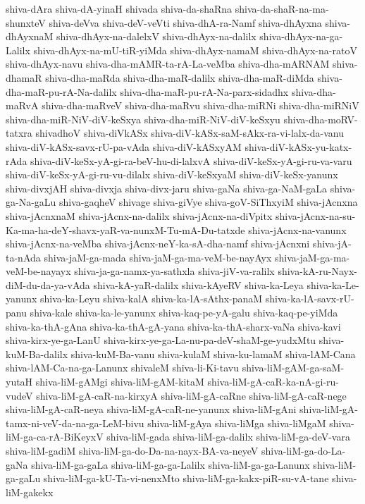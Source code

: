 {shiva-dAra
shiva-dA-yinaH
shivada
shiva-da-shaRna
shiva-da-shaR-na-ma-shunxteV
shiva-deVva
shiva-deV-veVti
shiva-dhA-ra-Namf
shiva-dhAyxna
shiva-dhAyxnaM
shiva-dhAyx-na-dalelxV
shiva-dhAyx-na-dalilx
shiva-dhAyx-na-ga-Lalilx
shiva-dhAyx-na-mU-tiR-yiMda
shiva-dhAyx-namaM
shiva-dhAyx-na-ratoV
shiva-dhAyx-navu
shiva-dha-mAMR-ta-rA-La-veMba
shiva-dha-mARNAM
shiva-dhamaR
shiva-dha-maRda
shiva-dha-maR-dalilx
shiva-dha-maR-diMda
shiva-dha-maR-pu-rA-Na-dalilx
shiva-dha-maR-pu-rA-Na-parx-sidadhx
shiva-dha-maRvA
shiva-dha-maRveV
shiva-dha-maRvu
shiva-dha-miRNi
shiva-dha-miRNiV
shiva-dha-miR-NiV-diV-keSxya
shiva-dha-miR-NiV-diV-keSxyu
shiva-dha-moRV-tatxra
shivadhoV
shiva-diVkASx
shiva-diV-kASx-saM-sAkx-ra-vi-lalx-da-vanu
shiva-diV-kASx-savx-rU-pa-vAda
shiva-diV-kASxyAM
shiva-diV-kASx-yu-katx-rAda
shiva-diV-keSx-yA-gi-ra-beV-hu-di-lalxvA
shiva-diV-keSx-yA-gi-ru-va-varu
shiva-diV-keSx-yA-gi-ru-vu-dilalx
shiva-diV-keSxyaM
shiva-diV-keSx-yanunx
shiva-divxjAH
shiva-divxja
shiva-divx-jaru
shiva-gaNa
shiva-ga-NaM-gaLa
shiva-ga-Na-gaLu
shiva-gaqheV
shivage
shiva-giVye
shiva-goV-SiThxyiM
shiva-jAcnxna
shiva-jAcnxnaM
shiva-jAcnx-na-dalilx
shiva-jAcnx-na-diVpitx
shiva-jAcnx-na-su-Ka-ma-ha-deY-shavx-yaR-va-nunxM-Tu-mA-Du-tatxde
shiva-jAcnx-na-vanunx
shiva-jAcnx-na-veMba
shiva-jAcnx-neY-ka-sA-dha-namf
shiva-jAcnxni
shiva-jA-ta-nAda
shiva-jaM-ga-mada
shiva-jaM-ga-ma-veM-be-nayAyx
shiva-jaM-ga-ma-veM-be-nayayx
shiva-ja-ga-namx-ya-sathxla
shiva-jiV-va-ralilx
shiva-kA-ru-Nayx-diM-du-da-ya-vAda
shiva-kA-yaR-dalilx
shiva-kAyeRV
shiva-ka-Leya
shiva-ka-Le-yanunx
shiva-ka-Leyu
shiva-kalA
shiva-ka-lA-sAthx-panaM
shiva-ka-lA-savx-rU-panu
shiva-kale
shiva-ka-le-yanunx
shiva-kaq-pe-yA-galu
shiva-kaq-pe-yiMda
shiva-ka-thA-gAna
shiva-ka-thA-gA-yana
shiva-ka-thA-sharx-vaNa
shiva-kavi
shiva-kirx-ye-ga-LanU
shiva-kirx-ye-ga-La-nu-pa-deV-shaM-ge-yudxMtu
shiva-kuM-Ba-dalilx
shiva-kuM-Ba-vanu
shiva-kulaM
shiva-ku-lamaM
shiva-lAM-Cana
shiva-lAM-Ca-na-ga-Lanunx
shivaleM
shiva-li-Ki-tavu
shiva-liM-gAM-ga-saM-yutaH
shiva-liM-gAMgi
shiva-liM-gAM-kitaM
shiva-liM-gA-caR-ka-nA-gi-ru-vudeV
shiva-liM-gA-caR-na-kirxyA
shiva-liM-gA-caRne
shiva-liM-gA-caR-nege
shiva-liM-gA-caR-neya
shiva-liM-gA-caR-ne-yanunx
shiva-liM-gAni
shiva-liM-gA-tamx-ni-veV-da-na-ga-LeM-bivu
shiva-liM-gAya
shiva-liMga
shiva-liMgaM
shiva-liM-ga-ca-rA-BiKeyxV
shiva-liM-gada
shiva-liM-ga-dalilx
shiva-liM-ga-deV-vara
shiva-liM-gadiM
shiva-liM-ga-do-Da-na-nayx-BA-va-neyeV
shiva-liM-ga-do-La-gaNa
shiva-liM-ga-gaLa
shiva-liM-ga-ga-Lalilx
shiva-liM-ga-ga-Lanunx
shiva-liM-ga-gaLu
shiva-liM-ga-kU-Ta-vi-nenxMto
shiva-liM-ga-kakx-piR-su-vA-tane
shiva-liM-gakekx
}
